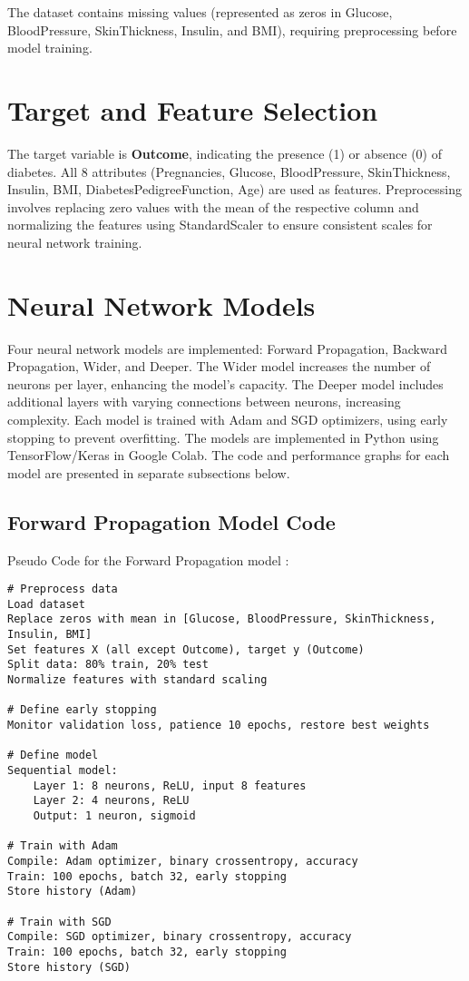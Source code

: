 \documentclass[a4paper,12pt]{article}
\begin{document}
The dataset contains missing values (represented as zeros in Glucose, BloodPressure, SkinThickness, Insulin, and BMI), requiring preprocessing before model training.

\section*{Target and Feature Selection}
The target variable is \textbf{Outcome}, indicating the presence (1) or absence (0) of diabetes. All 8 attributes (Pregnancies, Glucose, BloodPressure, SkinThickness, Insulin, BMI, DiabetesPedigreeFunction, Age) are used as features. Preprocessing involves replacing zero values with the mean of the respective column and normalizing the features using StandardScaler to ensure consistent scales for neural network training.

\section*{Neural Network Models}
Four neural network models are implemented: Forward Propagation, Backward Propagation, Wider, and Deeper. The Wider model increases the number of neurons per layer, enhancing the model’s capacity. The Deeper model includes additional layers with varying connections between neurons, increasing complexity. Each model is trained with Adam and SGD optimizers, using early stopping to prevent overfitting. The models are implemented in Python using TensorFlow/Keras in Google Colab. The code and performance graphs for each model are presented in separate subsections below.

\subsection*{Forward Propagation Model Code}
Pseudo Code for the Forward Propagation model :
\begin{verbatim}
# Preprocess data
Load dataset
Replace zeros with mean in [Glucose, BloodPressure, SkinThickness, Insulin, BMI]
Set features X (all except Outcome), target y (Outcome)
Split data: 80% train, 20% test
Normalize features with standard scaling

# Define early stopping
Monitor validation loss, patience 10 epochs, restore best weights

# Define model
Sequential model:
    Layer 1: 8 neurons, ReLU, input 8 features
    Layer 2: 4 neurons, ReLU
    Output: 1 neuron, sigmoid

# Train with Adam
Compile: Adam optimizer, binary crossentropy, accuracy
Train: 100 epochs, batch 32, early stopping
Store history (Adam)

# Train with SGD
Compile: SGD optimizer, binary crossentropy, accuracy
Train: 100 epochs, batch 32, early stopping
Store history (SGD)
\end{verbatim}
\newpage
\end{document}
